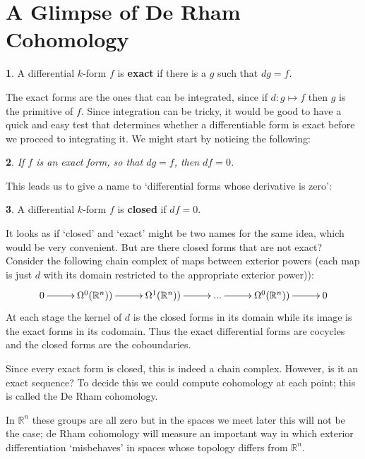 \documentclass[oneside,english]{amsbook}
\numberwithin{section}{chapter}
\theoremstyle{plain}
\newtheorem{thm}{\protect\theoremname}
\theoremstyle{definition}
\newtheorem{defn}[thm]{\protect\definitionname}
\providecommand{\definitionname}{Definition}
\providecommand{\theoremname}{Theorem}
\begin{document}
			

		\section{A Glimpse of De Rham Cohomology}
		
			\begin{defn}
				A differential $k$-form $f$ is \textbf{exact} if there is a $g$ such that $dg = f$. 
			\end{defn}
			
			The exact forms are the ones that can be integrated, since if $d:g\mapsto f$ then $g$ is the primitive of $f$. Since integration can be tricky, it would be good to have a quick and easy test that determines whether a differentiable form is exact before we proceed to integrating it. We might start by noticing the following:

			\begin{thm}
				If $f$ is an exact form, so that $dg = f$, then $df = 0$.
			\end{thm}
			
			This leads us to give a name to `differential forms whose derivative is zero':
			
			\begin{defn}
				A differential $k$-form $f$ is \textbf{closed} if $df = 0$. 
			\end{defn}
	
			It looks as if `closed' and `exact' might be two names for the same idea, which would be very convenient. But are there closed forms that are not exact? Consider the following chain complex of maps between exterior powers (each map is just $d$ with its domain restricted to the appropriate exterior power)):		
			\[ 
			\xymatrix@C+0.3em{
				0 \ar[r] & \Omega^0(\mathbb{R}^n))\ar[r] & \Omega^1(\mathbb{R}^n))\ar[r] & ... \ar[r] & \Omega^0(\mathbb{R}^n))\ar[r]  & 0
			}
			\]
			At each stage the kernel of $d$ is the closed forms in its domain while its image is the exact forms in its codomain. Thus the exact differential forms are cocycles and the closed forms are the coboundaries.
			
			Since every exact form is closed, this is indeed a chain complex. However, is it an exact sequence? To decide this we could compute cohomology at each point; this is called the De Rham cohomology. 
			
			In $\mathbb{R}^n$ these groups are all zero but in the spaces we meet later this will not be the case; de Rham cohomology will measure an important way in which exterior differentiation `misbehaves' in spaces whose topology differs from $\mathbb{R}^n$.
\end{document}
